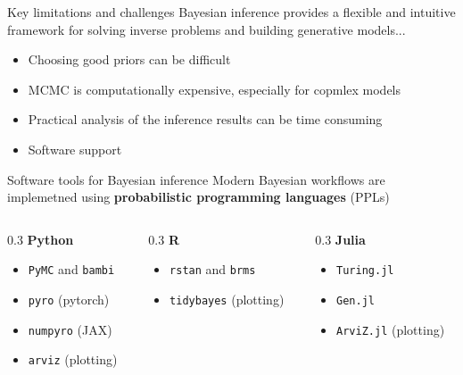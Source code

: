 \documentclass[12pt,aspectratio=169]{beamer}
\begin{document}
\begin{frame}{Key limitations and challenges}
Bayesian inference provides a flexible and intuitive framework for solving inverse problems and building generative models...

\begin{itemize}[<+->]
    \item Choosing good priors can be difficult
    \newline
    \item MCMC is computationally expensive, especially for copmlex models
    \newline
    \item Practical analysis of the inference results can be time consuming
    \newline
    \item Software support
\end{itemize}

\end{frame}

\begin{frame}{Software tools for Bayesian inference}
    Modern Bayesian workflows are implemetned using \textbf{probabilistic programming languages} (PPLs)
    \pause\newline

    \begin{columns}[t]
        \begin{column}{0.3\linewidth}
            \textbf{Python}
            \begin{itemize}
                \item \texttt{PyMC} and \texttt{bambi}
                \item \texttt{pyro} (pytorch)
                \item \texttt{numpyro} (JAX)
                \item \texttt{arviz} (plotting)
            \end{itemize}
        \end{column}

        \begin{column}{0.3\linewidth}
            \textbf{R}
            \begin{itemize}
                \item \texttt{rstan} and \texttt{brms}
                \item \texttt{tidybayes} (plotting)
            \end{itemize}
        \end{column}

        \begin{column}{0.3\linewidth}
            \textbf{Julia}
            \begin{itemize}
                \item \texttt{Turing.jl}
                \item \texttt{Gen.jl}
                \item \texttt{ArviZ.jl} (plotting)
            \end{itemize}
        \end{column}
    \end{columns}
\end{frame}
\end{document}
